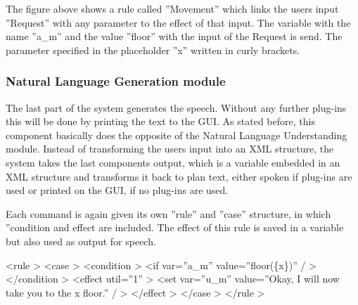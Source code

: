 \documentclass[a4paper, 12pt]{article}
\begin{document}
The figure above shows  a rule called ”Movement” which links the users input ”Request” with any parameter to the effect of that input.
The variable with the name ”a\_m” and the value ”floor” with the input of the Request is send.
The parameter specified in the placeholder ”x” written in curly brackets.

\subsubsection{Natural Language Generation module}

The last part of the system generates the speech. 
Without any further plug-ins this will be done by printing the text to the GUI.
As stated before, this component basically does the opposite of the Natural Language Understanding module. 
Instead of transforming the users input into an XML structure, the system takes the last components output, which is a variable embedded in an XML structure and transforms it back to plan text, either spoken if plug-ins are used or printed on the GUI, if no plug-ins are used. \newline

Each command is again given its own ”rule” and ”case” structure, in which ”condition and effect are included. 
The effect of this rule is saved in a variable but also used as output for speech. \newline

\textless rule \textgreater \newline
\indent \indent \textless case \textgreater \newline
\indent \indent \indent \textless condition \textgreater \newline 
\indent \indent \indent \indent \textless if var=”a\_m” value=”floor(\{x\})” / \textgreater \newline
\indent \indent \indent \textless /condition \textgreater \newline
\indent \indent \indent \textless effect util=”1” \textgreater \newline 
\indent \indent \indent \indent \textless set var=”u\_m” value=”Okay, I will now take you to the {x} floor.” / \textgreater \newline
\indent \indent \indent \textless /effect \textgreater \newline
\indent \indent\textless /case \textgreater \newline
\indent \textless /rule \textgreater \newline
\end{document}

